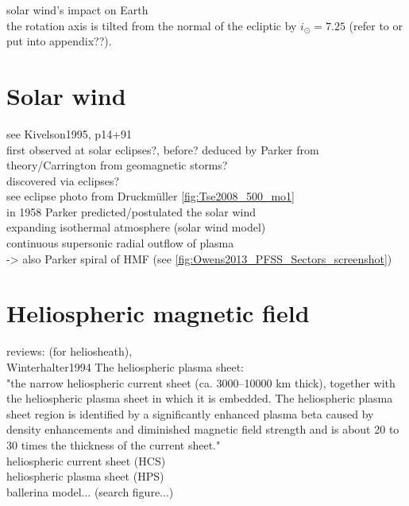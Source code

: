 solar wind's impact on Earth\\

the rotation axis is tilted from the normal of the ecliptic by $i_\odot = 7.25$\textdegree{} \citep{USNO2015} (refer to or put into appendix??).\\ %



\section{Solar wind}
\label{sec:solar_wind}

see Kivelson1995, p14+91\\
first observed at solar eclipses?, before? deduced by Parker from theory/Carrington from geomagnetic storms?\\

discovered via eclipses?\\
see eclipse photo from Druckmüller \autoref{fig:Tse2008_500_mo1}\\

in 1958 Parker predicted/postulated the solar wind \citep{Parker1958}\\
expanding isothermal atmosphere (solar wind model)\\
continuous supersonic radial outflow of plasma\\
-> also Parker spiral of HMF (see \autoref{fig:Owens2013_PFSS_Sectors_screenshot})


\section{Heliospheric magnetic field}	%

reviews: \citet{Balogh2009} (for heliosheath), \citet{Owens2013}\\

Winterhalter1994 The heliospheric plasma sheet:\\
"the narrow heliospheric current sheet (ca. 3000--10000 km thick), together with the heliospheric plasma sheet in which it is embedded. The heliospheric plasma sheet region is identified by a significantly enhanced plasma beta caused by density enhancements and diminished magnetic field strength and is about 20 to 30 times the thickness of the current sheet."\\
heliospheric current sheet (HCS)\\
heliospheric plasma sheet (HPS)\\
ballerina model... (search figure...)\\

